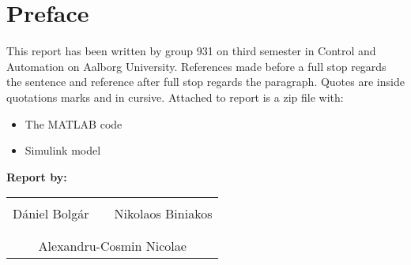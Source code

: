 \chapter*{Preface}
This report has been written by group 931 on third semester in Control and Automation on Aalborg University.
References made before a full stop regards the sentence and reference after full stop regards the paragraph. Quotes are inside quotations marks and in cursive.
Attached to report is a zip file with:
\begin{itemize}
	\item The MATLAB code 
	\item Simulink model
\end{itemize}
\vspace{2cm}

\textbf{Report by:}\\
\vspace{-5pt}
\begin{table}[H]
	\centering
	\begin{tabular}{c c c}
		\underline{\phantom{JAERJAERJAERJAERGO}} & \phantom{cookies} & \underline{\phantom{JAERJAERJAERJAERGO}} \\
		 	Dániel Bolgár	& \phantom{cookies} &  Nikolaos Biniakos	\\
		&&\\
		\multicolumn{3}{c}{\underline{\phantom{JAERJAERJAERJAERGO}}}\\
		\multicolumn{3}{c}{Alexandru-Cosmin Nicolae}\\				
						
	\end{tabular}
\end{table}


\pagebreak
